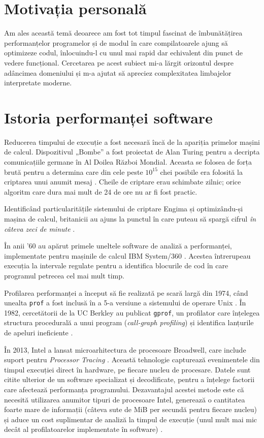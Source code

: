 \section{Motivația personală}

Am ales această temă deoarece am fost tot timpul fascinat de îmbunătățirea performanțelor programelor și de modul în care compilatoarele ajung să optimizeze codul, înlocuindu-l cu unul mai rapid dar echivalent din punct de vedere funcțional. Cercetarea pe acest subiect mi-a lărgit orizontul despre adâncimea domeniului și m-a ajutat să apreciez complexitatea limbajelor interpretate moderne.

\section{Istoria performanței software}

Reducerea timpului de execuție a fost necesară încă de la apariția primelor mașini de calcul. Dispozitivul „Bombe” a fost proiectat de Alan Turing pentru a decripta comunicațiile germane în Al Doilea Război Mondial. Aceasta se folosea de forța brută pentru a determina care din cele peste \(10^{15}\) chei posibile era folosită la criptarea unui anumit mesaj \cite{enigma_complexity}. Cheile de criptare erau schimbate zilnic; orice algoritm care dura mai mult de 24 de ore nu ar fi fost practic.

Identificând particularitățile sistemului de criptare Engima și optimizându-și mașina de calcul, britanicii au ajuns la punctul în care puteau să spargă cifrul \emph{în câteva zeci de minute} \cite{bombe_running_time}.

În anii '60 au apărut primele uneltele software de analiză a performanței, implementate pentru mașinile de calcul IBM System/360 \cite{ibm_system_360_profiling}. Acestea întrerupeau execuția la intervale regulate pentru a identifica blocurile de cod în care programul petrecea cel mai mult timp.

Profilarea performanței a început să fie realizată pe scară largă din 1974, când unealta \texttt{prof} a fost inclusă în a 5-a versiune a sistemului de operare Unix \cite{unix_manual}. În 1982, cercetătorii de la UC Berkley au publicat \texttt{gprof}, un profilator care înțelegea structura procedurală a unui program (\textit{call-graph profiling}) și identifica lanțurile de apeluri ineficiente \cite{gprof_paper}.

În 2013, Intel a lansat microarhitectura de procesoare Broadwell, care include suport pentru \emph{Processor Tracing} \cite{intel_pt}. Această tehnologie capturează evenimentele din timpul execuției direct în hardware, pe fiecare nucleu de procesare. Datele sunt citite ulterior de un software specializat și decodificate, pentru a înțelege factorii care afectează performanța programului. Dezavantajul acestei metode este că necesită utilizarea anumitor tipuri de procesoare Intel, generează o cantitatea foarte mare de informații (câteva sute de MiB per secundă pentru fiecare nucleu) și aduce un cost suplimentar de analiză la timpul de execuție (unul mult mai mic decât al profilatoarelor implementate în software) \cite{perf_intel_pt_man_page}.


